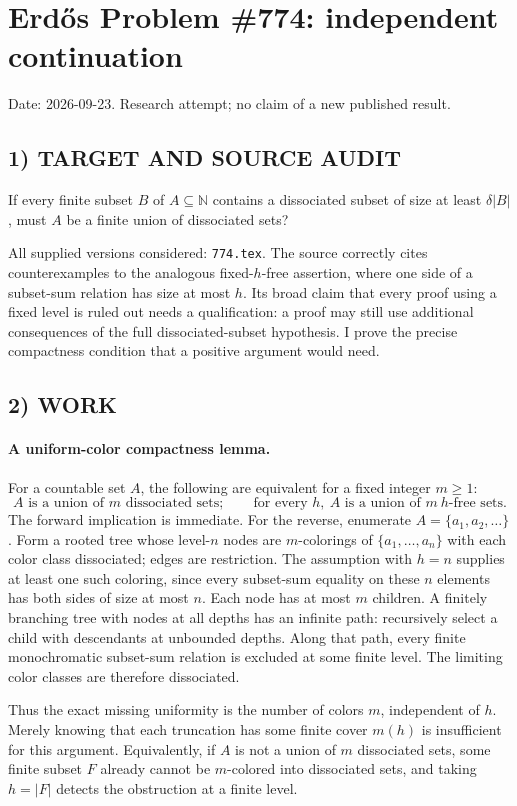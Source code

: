 \section{Erd\H{o}s Problem \#774: independent continuation}
\noindent Date: 2026-09-23. Research attempt; no claim of a new published result.
\subsection{1) TARGET AND SOURCE AUDIT}
If every finite subset $B$ of $A\subseteq\mathbb N$ contains a dissociated subset of size at least $\delta|B|$, must $A$ be a finite union of dissociated sets?

All supplied versions considered: \texttt{774.tex}.
The source correctly cites counterexamples to the analogous fixed-$h$-free assertion, where one side of a subset-sum relation has size at most $h$. Its broad claim that every proof using a fixed level is ruled out needs a qualification: a proof may still use additional consequences of the full dissociated-subset hypothesis. I prove the precise compactness condition that a positive argument would need.
\subsection{2) WORK}
\paragraph{A uniform-color compactness lemma.}
For a countable set $A$, the following are equivalent for a fixed integer $m\ge1$:
\[
A\text{ is a union of }m\text{ dissociated sets};
\qquad
\text{for every }h,\ A\text{ is a union of }m\ h\text{-free sets}. \tag{1}
\]
The forward implication is immediate. For the reverse, enumerate $A=\{a_1,a_2,\ldots\}$. Form a rooted tree whose level-$n$ nodes are $m$-colorings of $\{a_1,\ldots,a_n\}$ with each color class dissociated; edges are restriction. The assumption with $h=n$ supplies at least one such coloring, since every subset-sum equality on these $n$ elements has both sides of size at most $n$. Each node has at most $m$ children. A finitely branching tree with nodes at all depths has an infinite path: recursively select a child with descendants at unbounded depths. Along that path, every finite monochromatic subset-sum relation is excluded at some finite level. The limiting color classes are therefore dissociated.

Thus the exact missing uniformity is the number of colors $m$, independent of $h$. Merely knowing that each truncation has some finite cover $m(h)$ is insufficient for this argument. Equivalently, if $A$ is not a union of $m$ dissociated sets, some finite subset $F$ already cannot be $m$-colored into dissociated sets, and taking $h=|F|$ detects the obstruction at a finite level.

